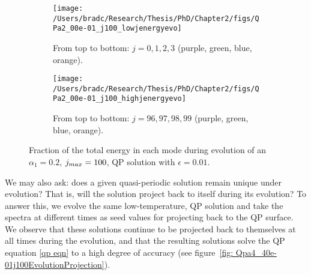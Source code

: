 \documentclass[../PhD.tex]{subfiles}
\begin{document}
\begin{figure}[H]
	\centering
	\begin{subfigure}[t]{0.47\textwidth}
		\texttt{[image: /Users/bradc/Research/Thesis/PhD/Chapter2/figs/QPa2\_00e-01\_j100\_lowjenergyevo]}
		\caption{From top to bottom: $j=0, 1, 2, 3$ (purple, green, blue, orange).}
	\end{subfigure}
	\hfill
	\begin{subfigure}[t]{0.47\textwidth}
		\texttt{[image: /Users/bradc/Research/Thesis/PhD/Chapter2/figs/QPa2\_00e-01\_j100\_highjenergyevo]}
		\caption{From top to bottom: $j=96, 97, 98, 99$ (purple, green, blue, orange).}
	\end{subfigure}
	\caption[Evolution of QP solutions at low temperature]{Fraction of the total energy in each mode during evolution of an $\alpha_1 = 0.2$, $j_{max} = 100$, QP solution with $\epsilon=0.01$.}
	\label{fig:qpevo}
\end{figure}



We may also ask: does a given quasi-periodic solution remain unique under evolution? That is, will the solution project back to itself during its evolution? To answer this, we evolve the same low-temperature, QP solution and take the spectra at different times as seed values for projecting back to the QP surface. We observe that these solutions continue to be projected back to themselves at all times during the evolution, and that the resulting solutions solve the QP equation \eqref{qp eqn} to a high degree of accuracy (see figure~\ref{fig: Qpa4_40e-01j100EvolutionProjection}). 
\end{document}
